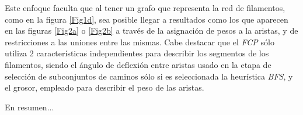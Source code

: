     
Este enfoque faculta que al tener un grafo que representa la red de filamentos, como en la figura \ref{Fig1d}, sea posible llegar a resultados como los que aparecen en las figuras \ref{Fig2a} o \ref{Fig2b} a trav\'es de la asignaci\'on de pesos a la aristas, y de restricciones a las uniones entre las mismas. Cabe destacar que el {\it FCP} s\'olo utiliza 2 caracter\'isticas independientes para describir los segmentos de los filamentos, siendo el \'angulo de deflexi\'on entre aristas usado en la etapa de selecci\'on de subconjuntos de caminos s\'olo si es seleccionada la heur\'istica {\it BFS}, y el grosor, empleado para describir el peso de las aristas.  

En resumen...


